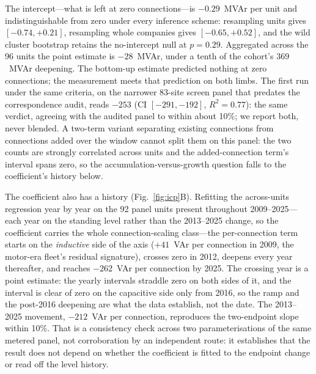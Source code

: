 \documentclass[journal]{IEEEtran}
\begin{document}
The intercept---what is left at zero connections---is $-0.29$~MVAr per unit
and indistinguishable from zero under every inference scheme: resampling units
gives $[-0.74,+0.21]$, resampling whole companies gives $[-0.65,+0.52]$, and
the wild cluster bootstrap retains the no-intercept null at $p=0.29$.
Aggregated across the 96 units the point estimate is $-28$~MVAr, under a tenth
of the cohort's $369$~MVAr deepening. The bottom-up estimate predicted nothing
at zero connections; the measurement meets that prediction on both
limbs. The first run under the same
criteria, on the narrower 83-site screen panel that predates the
correspondence audit, reads $-253$ (CI $[-291,-192]$, $R^2=0.77$): the same
verdict, agreeing with the audited panel to within about 10\%; we report
both, never blended. A
two-term variant separating existing connections from connections added over the
window cannot split them on this panel: the two counts are strongly correlated
across units and the added-connection term's interval spans zero, so the
accumulation-versus-growth question falls to the coefficient's history below.

The coefficient also has a history (Fig.~\ref{fig:icp}B). Refitting the
across-units regression year by year on the 92 panel units present throughout
2009--2025---each year on the standing level rather than the 2013--2025
change, so the coefficient carries the whole connection-scaling class---the
per-connection term starts on the \emph{inductive} side of the axis ($+41$~VAr
per connection in 2009, the motor-era fleet's residual signature), crosses
zero in 2012, deepens every year thereafter, and reaches $-262$~VAr per
connection by 2025. The crossing year is a point estimate: the yearly intervals
straddle zero on both sides of it, and the interval is clear of zero on the
capacitive side only from 2016, so the ramp and the post-2016 deepening are
what the data establish, not the date. The 2013--2025 movement,
$-212$~VAr per connection, reproduces the two-endpoint slope within 10\%. That
is a consistency check across two parameterisations of the same metered panel,
not corroboration by an independent route: it establishes that the result does
not depend on whether the coefficient is fitted to the endpoint change or read
off the level history.
\end{document}
